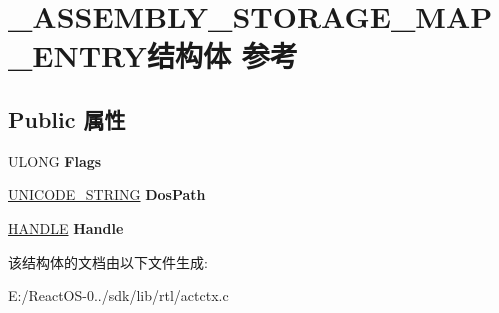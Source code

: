 \hypertarget{struct___a_s_s_e_m_b_l_y___s_t_o_r_a_g_e___m_a_p___e_n_t_r_y}{}\section{\+\_\+\+A\+S\+S\+E\+M\+B\+L\+Y\+\_\+\+S\+T\+O\+R\+A\+G\+E\+\_\+\+M\+A\+P\+\_\+\+E\+N\+T\+R\+Y结构体 参考}
\label{struct___a_s_s_e_m_b_l_y___s_t_o_r_a_g_e___m_a_p___e_n_t_r_y}
\subsection*{Public 属性}
\begin{DoxyCompactItemize}
\item 
\mbox{\label{struct___a_s_s_e_m_b_l_y___s_t_o_r_a_g_e___m_a_p___e_n_t_r_y_ad5f3bc9b85a0052f5596acd33d5c2d2a}} 
U\+L\+O\+NG {\bfseries Flags}
\item 
\mbox{\label{struct___a_s_s_e_m_b_l_y___s_t_o_r_a_g_e___m_a_p___e_n_t_r_y_a00e494424ba544763ff5b633c691db86}} 
\hyperlink{struct___u_n_i_c_o_d_e___s_t_r_i_n_g}{U\+N\+I\+C\+O\+D\+E\+\_\+\+S\+T\+R\+I\+NG} {\bfseries Dos\+Path}
\item 
\mbox{\label{struct___a_s_s_e_m_b_l_y___s_t_o_r_a_g_e___m_a_p___e_n_t_r_y_a9f97f9ed734d7ef0d29933eb5f79a939}} 
\hyperlink{interfacevoid}{H\+A\+N\+D\+LE} {\bfseries Handle}
\end{DoxyCompactItemize}


该结构体的文档由以下文件生成\+:\begin{DoxyCompactItemize}
\item 
E\+:/\+React\+O\+S-\/0../sdk/lib/rtl/actctx.\+c\end{DoxyCompactItemize}
